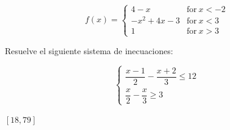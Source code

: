 \documentclass[addpoints,spanish, 12pt,a4paper]{exam}
\begin{document}
\begin{questions}
$$f(x)=\begin{cases} 4 - x & \text{for}\: x < -2 \\- x^{2} + 4 x - 3 & \text{for}\: x < 3 \\1 & \text{for}\: x > 3 \end{cases}$$\begin{solution} \end{solution} 
 
 \question[1] Resuelve el siguiente sistema de inecuaciones:
 
 $$\left\{\begin{matrix}\dfrac{{x - 1}}{2} - \dfrac{{x + 2}}{3} \leq 12 \\  \dfrac{x}{2} - \dfrac{x}{3} \geq 3\end{matrix}\right.$$
\begin{solution} $\left[18, 79\right]$ \end{solution}
 


\end{questions}
\end{document}
